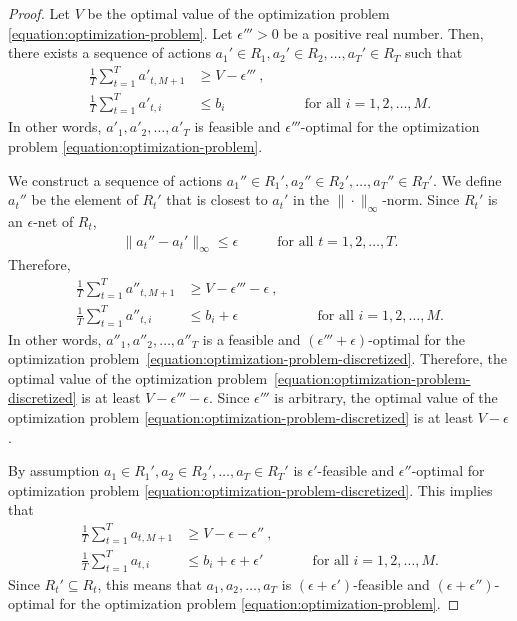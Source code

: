 \documentclass[12pt]{article}
\theoremstyle{definition}
\begin{document}
\begin{proof}
Let $V$ be the optimal value of the optimization problem
\eqref{equation:optimization-problem}. Let $\epsilon''' > 0$ be a positive real
number. Then, there exists a sequence of actions $a_1' \in R_1, a_2' \in R_2, \dots, a_T' \in R_T$ such that
\begin{align*}
\frac{1}{T} \sum_{t=1}^T a'_{t,M+1} & \ge V - \epsilon''' \: , \\
\frac{1}{T} \sum_{t=1}^T a'_{t,i} & \le b_i & \qquad \text{for all $i=1,2,\dots,M$.}
\end{align*}
In other words, $a'_1, a'_2, \dots, a'_T$ is feasible and $\epsilon'''$-optimal
for the optimization problem \eqref{equation:optimization-problem}.

We construct a sequence of actions $a_1'' \in R_1', a_2'' \in R_2', \dots, a_T'' \in R_T'$. We define
$a_t''$ be the element of $R_t'$ that is closest to $a_t'$ in the
$\|\cdot\|_\infty$-norm. Since $R_t'$ is an $\epsilon$-net of $R_t$,
\begin{align*}
\|a_t'' - a_t'\|_\infty \le \epsilon & \qquad \text{for all $t=1,2,\dots,T$.}
\end{align*}
Therefore,
\begin{align*}
\frac{1}{T} \sum_{t=1}^T a''_{t,M+1} & \ge V - \epsilon''' - \epsilon \: , \\
\frac{1}{T} \sum_{t=1}^T a''_{t,i} & \le b_i + \epsilon & \qquad \text{for all $i=1,2,\dots,M$.}
\end{align*}
In other words, $a''_1, a''_2, \dots, a''_T$ is a feasible and $(\epsilon''' +
\epsilon)$-optimal for the optimization
problem~\eqref{equation:optimization-problem-discretized}. Therefore, the
optimal value of the optimization
problem~\eqref{equation:optimization-problem-discretized} is at least $V -
\epsilon''' - \epsilon$. Since $\epsilon'''$ is arbitrary, the optimal value of
the optimization problem \eqref{equation:optimization-problem-discretized} is at
least $V - \epsilon$.

By assumption $a_1 \in R_1', a_2 \in R_2', \dots, a_T \in R_T'$ is $\epsilon'$-feasible and $\epsilon''$-optimal for
optimization problem \eqref{equation:optimization-problem-discretized}. This implies that
\begin{align*}
\frac{1}{T} \sum_{t=1}^T a_{t,M+1} & \ge V - \epsilon - \epsilon'' \: , \\
\frac{1}{T} \sum_{t=1}^T a_{t,i} & \le b_i + \epsilon + \epsilon' & \qquad \text{for all $i=1,2,\dots,M$.}
\end{align*}
Since $R_t' \subseteq R_t$, this means that $a_1, a_2, \dots, a_T$
is $(\epsilon + \epsilon')$-feasible and $(\epsilon + \epsilon'')$-optimal for
the optimization problem \eqref{equation:optimization-problem}.
\end{proof}
\end{document}
